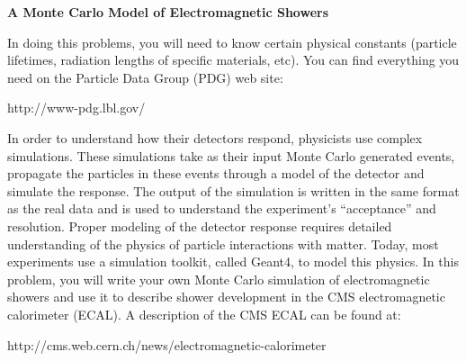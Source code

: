 

\begin{center}
{\large\bf A Monte Carlo Model of Electromagnetic Showers
}
\end{center}
\vskip0.2in


In doing this problems, you will need to know certain physical constants (particle lifetimes,
radiation lengths of specific materials, etc).  You can find everything
you need on the Particle Data Group (PDG) web site:
\begin{flushleft}
  http://www-pdg.lbl.gov/
  \end{flushleft}

In order to understand how their detectors respond, physicists
use complex simulations.  These simulations take as their input Monte Carlo
generated events, propagate the particles in these events through a model
of the detector and simulate the response.  The output of the simulation
is written in the same format as the real data and is used
to understand the experiment's ``acceptance'' and resolution.
Proper modeling of the detector response requires detailed understanding
of the physics of particle interactions with matter.  Today, most
experiments use a simulation toolkit, called Geant4, to model this physics.
In this problem, you will write your own Monte Carlo simulation of
electromagnetic showers and use it to describe shower development in the
CMS electromagnetic calorimeter (ECAL).  A description 
of the CMS ECAL can be found at:
\begin{flushleft}
http://cms.web.cern.ch/news/electromagnetic-calorimeter
\end{flushleft}

